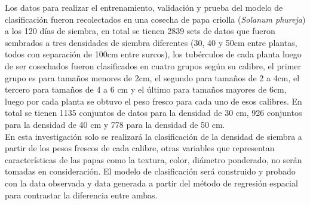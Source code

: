 Los datos para realizar el entrenamiento, validación y prueba del modelo de clasificación fueron recolectados en una cosecha de papa criolla (\textit{Solanum phureja}) a los 120 días de siembra, en total se tienen 2839 sets de datos que fueron sembrados a tres densidades de siembra diferentes (30, 40 y 50cm entre plantas, todos con separación de 100cm entre surcos), los tubérculos de cada planta luego de ser cosechados fueron clasificados en cuatro grupos según su calibre, el primer grupo es para tamaños menores de 2cm, el segundo para tamaños de 2 a 4cm, el tercero para tamaños de 4 a 6 cm y el último para tamaños mayores de 6cm, luego por cada planta se obtuvo el peso fresco para cada uno de esos calibres. En total se tienen 1135 conjuntos de datos para la densidad de 30 cm, 926 conjuntos para la densidad de 40 cm y 778 para la densidad de 50 cm.\\

En esta investigación solo se realizará la clasificación de la densidad de siembra a partir de los pesos frescos de cada calibre, otras variables que representan características de las papas como la textura, color, diámetro ponderado, no serán tomadas en consideración. El modelo de clasificación será construido y probado con la data observada y data generada a partir del método de regresión espacial para contrastar la diferencia entre ambas. 
